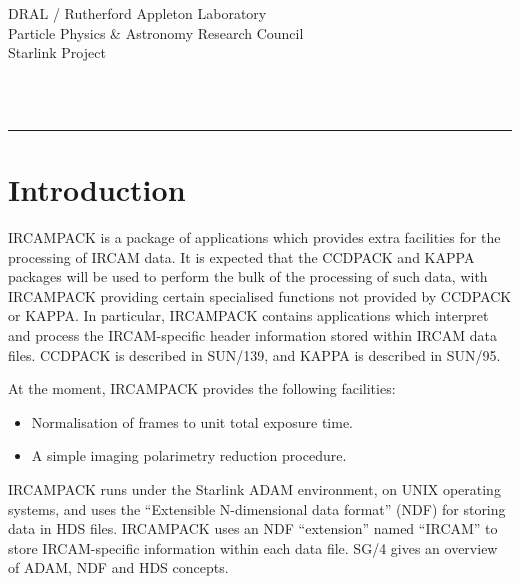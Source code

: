 \thispagestyle{empty}
DRAL / {\sc Rutherford Appleton Laboratory} \hfill {\bf \stardocname}\\
{\large Particle Physics \& Astronomy Research Council}\\
{\large Starlink Project\\}
{\large \stardoccategory\ \stardocnumber}
\begin{flushright}
\stardocauthors\\
\stardocdate
\end{flushright}
\vspace{-4mm}
\rule{\textwidth}{0.5mm}
\vspace{5mm}
\begin{center}
{\Large\bf \stardoctitle}
\end{center}
\vspace{5mm}

\setlength{\parskip}{0mm} \tableofcontents
\setlength{\parskip}{\medskipamount} \markright{\stardocname} \newpage

\section{Introduction}

{\small IRCAMPACK} is a package of applications which provides extra
facilities for the processing of {\small IRCAM} data. It is expected
that the {\small CCDPACK} and {\small KAPPA} packages will be used to
perform the bulk of the processing of such data, with {\small
IRCAMPACK} providing certain specialised functions not provided by
{\small CCDPACK} or {\small KAPPA}. In particular, {\small IRCAMPACK}
contains applications which interpret and process the {\small
IRCAM}-specific header information stored within {\small IRCAM} data
files. {\small CCDPACK} is described in SUN/139, and {\small KAPPA} is
described in SUN/95.

At the moment, {\small IRCAMPACK} provides the following facilities:

\begin{itemize}

\item Normalisation of frames to unit total exposure time.

\item A simple imaging polarimetry reduction procedure.

\end{itemize}

{\small IRCAMPACK} runs under the Starlink {\small ADAM} environment,
on {\small UNIX} operating systems, and uses the ``Extensible
N-dimensional data format'' ({\small NDF}) for storing data in {\small
HDS} files. {\small IRCAMPACK} uses an {\small NDF} ``extension'' named
``{\small IRCAM}'' to store {\small IRCAM}-specific information within
each data file. SG/4 gives an overview of {\small ADAM}, {\small NDF}
and {\small HDS} concepts.

